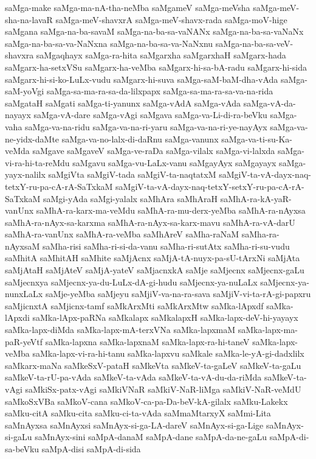 {saMga-make
saMga-ma-nA-tha-neMba
saMgameV
saMga-meVsha
saMga-meV-sha-na-lavaR
saMga-meV-shavxrA
saMga-meV-shavx-rada
saMga-moV-hige
saMgana
saMga-na-ba-savaM
saMga-na-ba-sa-vaNANx
saMga-na-ba-sa-vaNaNx
saMga-na-ba-sa-va-NaNxna
saMga-na-ba-sa-va-NaNxnu
saMga-na-ba-sa-veV-shavxra
saMgaqhayx
saMga-ra-hita
saMgarxha
saMgarxhaH
saMgarx-hada
saMgarx-ha-setxVSu
saMgarx-ha-veMba
saMgarx-hi-sa-bA-radu
saMgarx-hi-sida
saMgarx-hi-si-ko-LuLx-vudu
saMgarx-hi-suva
saMga-saM-baM-dha-vAda
saMga-saM-yoVgi
saMga-sa-ma-ra-sa-da-lilxpapx
saMga-sa-ma-ra-sa-va-na-rida
saMgataH
saMgati
saMga-ti-yanunx
saMga-vAdA
saMga-vAda
saMga-vA-da-nayayx
saMga-vA-dare
saMga-vAgi
saMgava
saMga-va-Li-di-ra-beVku
saMga-vaha
saMga-va-na-ridu
saMga-va-na-ri-yaru
saMga-va-na-ri-ye-nayAyx
saMga-va-ne-yidx-daMte
saMga-va-no-lalx-di-daRnu
saMga-vanunx
saMga-va-ti-su-Ka-veMda
saMgave
saMgaveV
saMga-ve-raDa
saMga-vilalx
saMga-vi-lalxda
saMga-vi-ra-hi-ta-reMdu
saMgavu
saMga-vu-LaLx-vanu
saMgayAyx
saMgayayx
saMga-yayx-nalilx
saMgiVta
saMgiV-tada
saMgiV-ta-naqtatxM
saMgiV-ta-vA-dayx-naq-tetxY-ru-pa-cA-rA-SaTxkaM
saMgiV-ta-vA-dayx-naq-tetxY-setxY-ru-pa-cA-rA-SaTxkaM
saMgi-yAda
saMgi-yalalx
saMhAra
saMhAraH
saMhA-ra-kA-yaR-vanUnx
saMhA-ra-karx-ma-veMdu
saMhA-ra-mu-derx-yeMba
saMhA-ra-nAyxsa
saMhA-ra-nAyx-sa-karxma
saMhA-ra-nAyx-sa-karx-mavu
saMhA-ra-vA-darU
saMhA-ra-vanUnx
saMhA-ra-veMba
saMhAreV
saMha-raNaM
saMha-ra-nAyxsaM
saMha-risi
saMha-ri-si-da-vanu
saMha-ri-sutAtx
saMha-ri-su-vudu
saMhitA
saMhitAH
saMhite
saMjAcnx
saMjA-tA-nuyx-pa-sU-tArxNi
saMjAta
saMjAtaH
saMjAteV
saMjA-yateV
saMjacnxkA
saMje
saMjecnx
saMjecnx-gaLu
saMjecnxya
saMjecnx-ya-du-LuLx-dA-gi-hudu
saMjecnx-ya-nuLaLx
saMjecnx-ya-nunxLaLx
saMje-yeMba
saMjeyu
saMjiV-va-na-ra-sava
saMjiV-vi-ta-rA-gi-papxru
saMjicnxtA
saMjicnx-tamf
saMkArxMti
saMkArxMtw
saMka-lApxdf
saMka-lApxdi
saMka-lApx-paRNa
saMkalapx
saMkalapxH
saMka-lapx-deV-hi-yayayx
saMka-lapx-diMda
saMka-lapx-mA-terxVNa
saMka-lapxmaM
saMka-lapx-ma-paR-yeVtf
saMka-lapxna
saMka-lapxnaM
saMka-lapx-ra-hi-taneV
saMka-lapx-veMba
saMka-lapx-vi-ra-hi-tanu
saMka-lapxvu
saMkale
saMka-le-yA-gi-dadxlilx
saMkarx-maNa
saMkeSxV-pataH
saMkeVta
saMkeV-ta-gaLeV
saMkeV-ta-gaLu
saMkeV-ta-rU-pa-vAda
saMkeV-ta-vAda
saMkeV-ta-vA-du-da-riMda
saMkeV-ta-vAgi
saMkiSx-patx-vAgi
saMkiVNaR
saMkiV-NaR-liMga
saMkiV-NaR-veMdU
saMkoSxVBa
saMkoV-cana
saMkoV-ca-pa-Da-beV-kA-gilalx
saMku-Lakekx
saMku-citA
saMku-cita
saMku-ci-ta-vAda
saMmaMtarxyX
saMmi-Lita
saMnAyxsa
saMnAyxsi
saMnAyx-si-ga-LA-dareV
saMnAyx-si-ga-Lige
saMnAyx-si-gaLu
saMnAyx-sini
saMpA-danaM
saMpA-dane
saMpA-da-ne-gaLu
saMpA-di-sa-beVku
saMpA-disi
saMpA-di-sida
}
